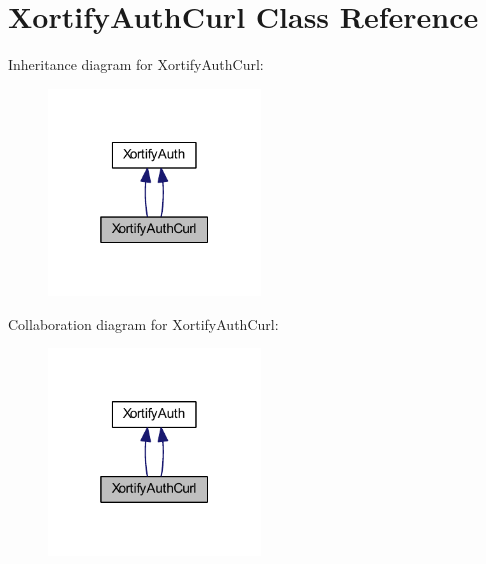 \hypertarget{class_xortify_auth_curl}{\section{Xortify\-Auth\-Curl Class Reference}
\label{class_xortify_auth_curl}
}


Inheritance diagram for Xortify\-Auth\-Curl\-:
\nopagebreak
\begin{figure}[H]
\begin{center}
\leavevmode
\includegraphics[width=160pt]{class_xortify_auth_curl__inherit__graph}
\end{center}
\end{figure}


Collaboration diagram for Xortify\-Auth\-Curl\-:
\nopagebreak
\begin{figure}[H]
\begin{center}
\leavevmode
\includegraphics[width=160pt]{class_xortify_auth_curl__coll__graph}
\end{center}
\end{figure}
